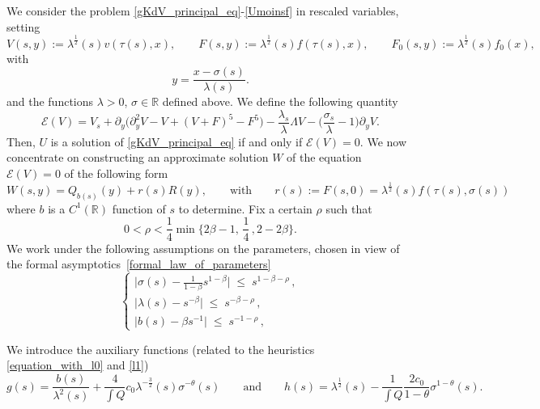 \documentclass[16pt,english, oneside,reqno]{smfart}
\newcommand{\RR}{\mathbb{R}}
\begin{document}
We consider the problem \eqref{gKdV_principal_eq}-\eqref{Umoinsf} in rescaled variables, setting
\begin{equation}
    V(s,y):= \lambda^{\frac{1}{2}}(s)v(\tau(s),x), \qquad F(s,y):= \lambda^{\frac{1}{2}}(s)f(\tau(s),x), \qquad F_0(s, y):= \lambda^{\frac{1}{2}}(s)f_0(x),
\end{equation}
with 
\begin{equation}
    y = \frac{x-\sigma(s)}{\lambda(s)}.
\end{equation}
and the functions $\lambda>0$,  $\sigma\in\RR$ defined above.
We define the following quantity
\begin{equation}\label{def_of_error_term_mathcal_E}
        \mathcal{E}(V) = V_s+\partial_y \big( \partial^2_y V -V + (V+F)^5 - F^5 \big) -\frac{\lambda_s}{\lambda}\Lambda V - \Big( \frac{\sigma_s}{\lambda}-1 \Big)\partial_yV.
    \end{equation}
Then,   $U$ is a solution of \eqref{gKdV_principal_eq} if and only if $\mathcal{E}(V) =0 $.
We now concentrate on constructing an approximate solution $W$ of the equation
$\mathcal{E}(V)=0$ of the following form 
\begin{equation}\label{def_of_W_and_of_r}
    W(s,y) = Q_{b(s)}(y)+r(s)R(y), \qquad \text{with} \qquad r(s):=F(s,0)= \lambda^{\frac{1}{2}}(s)f(\tau(s),\sigma(s))
\end{equation}
where $b$ is a $C^1(\RR)$ function of $s$ to determine.
Fix a certain $\rho$ such that 
\begin{equation}\label{condition_on_rho}
0<\rho < \frac{1}{4} \min{\{ 2\beta-1,\, \frac{1}{4}\, ,2-2\beta \}}.
\end{equation}%
We work under the following assumptions on the parameters, 
chosen in view of the formal asymptotics~\eqref{formal_law_of_parameters}
\begin{equation}\tag{BS1}\label{BS1}
    \begin{cases}
        \lvert \sigma(s) - \frac{1}{1-\beta} s^{1-\beta}\rvert \;\leq\; s^{1-\beta-\rho} \,, \\
        \lvert \lambda(s) - s^{-\beta} \rvert \;\leq\; s^{-\beta-\rho} \,,\\
        \lvert b(s) - \beta s^{-1} \rvert \;\leq\; s^{-1-\rho} \,,
    \end{cases}
\end{equation}

We introduce the auxiliary functions (related to the heuristics \eqref{equation_with_l0}
and \eqref{l1})
\begin{equation}\label{definition-g-h}
    g(s)= \frac{b(s)}{\lambda^2(s)}+\frac{4}{\int Q}c_0\lambda^{-\frac{3}{2}}(s)\sigma^{-\theta}(s) \qquad\text{and}\qquad h(s) = \lambda^{\frac{1}{2}}(s) - \frac{1}{\int Q}\frac{2c_0}{1-\theta}\sigma^{1-\theta}(s).
\end{equation}
\end{document}
